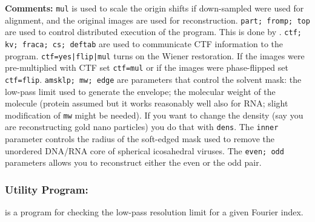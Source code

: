 \noindent\textbf{Comments:} \texttt{mul} is used to scale the origin shifts if down-sampled were used for alignment, and the original images are used for reconstruction. \texttt{part; fromp; top} are used to control distributed execution of the program. This is done by . \texttt{ctf; kv; fraca; cs; deftab} are used to communicate CTF information to the program. \texttt{ctf=yes|flip|mul} turns on the Wiener restoration. If the images were pre-multiplied with CTF set \texttt{ctf=mul} or if the images were phase-flipped set \texttt{ctf=flip}. \texttt{amsklp; mw; edge} are parameters that control the solvent mask: the low-pass limit used to generate the envelope; the molecular weight of the molecule (protein assumed but it works reasonably well also for RNA; slight modification of \texttt{mw} might be needed). If you want to change the density (say you are reconstructing gold nano particles) you do that with \texttt{dens}. The \texttt{inner} parameter controls the radius of the soft-edged mask used to remove the unordered DNA/RNA core of spherical icosahedral viruses. The \texttt{even; odd} parameters allows you to reconstruct either the even or the odd pair.

\subsubsection{Utility Program: }
\label{res}
 is a program for checking the low-pass resolution limit for a given Fourier index.\\

